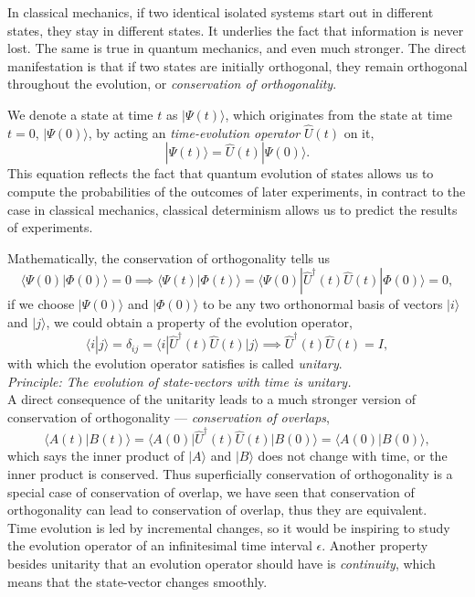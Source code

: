\documentclass{article}
\newcommand{\be}{\begin{equation}}
\newcommand{\ee}{\end{equation}}
\renewcommand{\1}{\left}
\renewcommand{\2}{\right}
\newcommand{\la}{\langle}
\newcommand{\ra}{\rangle}
\begin{document}
In classical mechanics, if two identical isolated systems start out in different states, they stay in different states. It underlies the fact that information is never lost. The same is true in quantum mechanics, and even much stronger. The direct manifestation is that if two states are initially orthogonal, they remain orthogonal throughout the evolution, or \textit{conservation of orthogonality}.

We denote a state at time $t$ as $|\Psi(t)\ra$, which originates from the state at time $t=0$, $|\Psi(0)\ra$, by acting an \textit{time-evolution operator} $\hat U(t)$ on it,
\be
|\Psi(t)\ra=\hat U(t) |\Psi(0)\ra.
\ee
This equation reflects the fact that quantum evolution of states allows us to compute the probabilities of the outcomes of later experiments, in contract to the case in classical mechanics, classical determinism allows us to predict the results of experiments. 

Mathematically, the conservation of orthogonality tells us
\be
\la \Psi(0)|\Phi(0)\ra=0 \implies \la \Psi(t)|\Phi(t)\ra=\la \Psi(0)|\hat U^\dagger(t) \hat U(t)|\Phi(0)\ra=0,
\ee
if we choose $|\Psi(0)\ra$ and $|\Phi(0)\ra$ to be any two orthonormal basis of vectors $|i\ra$ and $|j\ra$, we could obtain a property of the evolution operator,
\be
\la i|j\ra =\delta_{ij} = \la i|\hat U^\dagger(t) \hat U(t)|j\ra \implies \hat U^\dagger(t) \hat U(t)=I,
\ee
with which the evolution operator satisfies is called \textit{unitary}.\\

\textit{Principle: The evolution of state-vectors with time is unitary.}\\

A direct consequence of the unitarity leads to a much stronger version of conservation of orthogonality --- \textit{conservation of overlaps},
\be
\la A(t)|B(t)\ra = \la A(0) |\hat U^\dagger(t)\hat U(t)|B(0)\ra = \la A(0)|B(0)\ra,
\ee
which says the inner product of $|A\ra$ and $|B\ra$ does not change with time, or the inner product is conserved. Thus superficially conservation of orthogonality is a special case of conservation of overlap, we have seen that conservation of orthogonality can lead to conservation of overlap, thus they are equivalent.\\

Time evolution is led by incremental changes, so it would be inspiring to study the evolution operator of an infinitesimal time interval $\epsilon$. Another property besides unitarity that an evolution operator should have is \textit{continuity}, which means that the state-vector changes smoothly.
\end{document}
